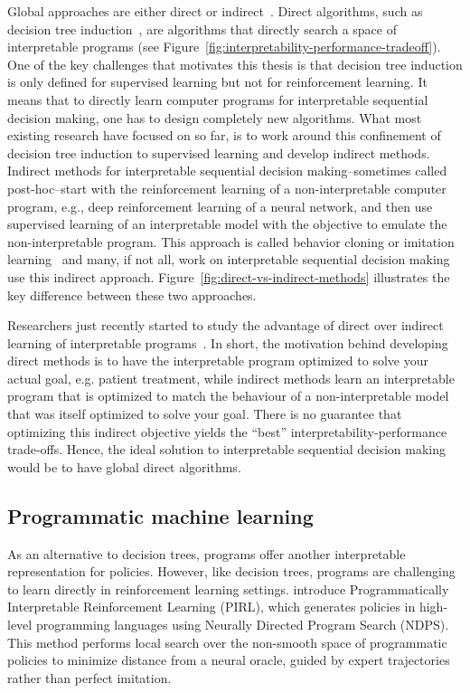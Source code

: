 Global approaches are either direct or indirect~\cite{milani-survey}. 
Direct algorithms, such as decision tree induction~\cite{breiman1984classification}, are algorithms that directly search a space of interpretable programs (see Figure~\ref{fig:interpretability-performance-tradeoff}). One of the key challenges that motivates this thesis is that decision tree induction is only defined for supervised learning but not for reinforcement learning. It means that to directly learn computer programs for interpretable sequential decision making, one has to design completely new algorithms. 
What most existing research have focused on so far, is to work around this confinement of decision tree induction to supervised learning and develop indirect methods. 
Indirect methods for interpretable sequential decision making--sometimes called post-hoc--start with the reinforcement learning of a non-interpretable computer program, e.g., deep reinforcement learning of a neural network, and then use supervised learning of an interpretable model with the objective to emulate the non-interpretable program. This approach is called behavior cloning or imitation learning~\cite{behavior-cloning,dagger} and many, if not all, work on interpretable sequential decision making use this indirect approach\cite{viper,PIRL}.
Figure~\ref{fig:direct-vs-indirect-methods} illustrates the key difference between these two approaches. 

Researchers just recently started to study the advantage of direct over indirect learning of interpretable programs~\cite{topin2021iterative,leap}. In short, the motivation behind developing direct methods is to have the interpretable program optimized to solve your actual goal, e.g. patient treatment, while indirect methods learn an interpretable program that is optimized to match the behaviour of a non-interpretable model that was itself optimized to solve your goal. There is no guarantee that optimizing this indirect objective yields the ``best'' interpretability-performance trade-offs. 
Hence, the ideal solution to interpretable sequential decision making would be to have global direct algorithms.

\subsection{Programmatic machine learning}

As an alternative to decision trees, programs offer another interpretable representation for policies. However, like decision trees, programs are challenging to learn directly in reinforcement learning settings. \cite{verma_programmatically_2018} introduce Programmatically Interpretable Reinforcement Learning (PIRL), which generates policies in high-level programming languages using Neurally Directed Program Search (NDPS). This method performs local search over the non-smooth space of programmatic policies to minimize distance from a neural oracle, guided by expert trajectories rather than perfect imitation.

